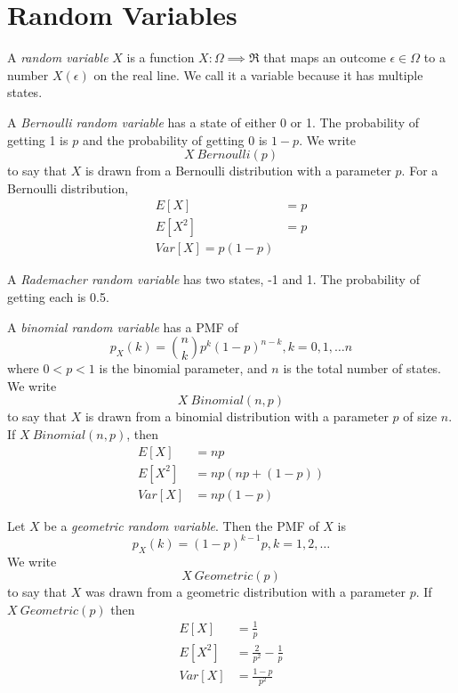 \section{Random Variables}

A \emph{random variable} $X$ is a function $X : \Omega \implies \Re$
that maps an outcome $\epsilon \in \Omega$ to a number $X(\epsilon)$ on the real line.
We call it a variable because it has multiple states.

A \emph{Bernoulli random variable} has a state
of either 0 or 1. The probability of getting 1 is $p$ and
the probability of getting 0 is $1 - p$. We write
\begin{equation}
    X ~ Bernoulli(p)
\end{equation}
to say that $X$ is drawn from a Bernoulli distribution
with a parameter $p$. For a Bernoulli distribution,
\begin{align}
    E[X]   & = p \\
    E[X^2] & = p \\
    Var[X] = p(1 - p)
\end{align}

A \emph{Rademacher random variable} has two states, -1 and 1.
The probability of getting each is 0.5.

A \emph{binomial random variable} has a PMF of
\begin{equation}
    p_X(k) = {n\choose k} p^k (1 - p)^{n - k}, k = 0, 1, \dots n
\end{equation}
where $0 < p < 1$ is the binomial parameter, and $n$ is the total
number of states. We write
\begin{equation}
    X ~ Binomial(n, p)
\end{equation}
to say that $X$ is drawn from a binomial distribution with a
parameter $p$ of size $n$.
If $X ~ Binomial(n, p)$, then
\begin{align}
    E[X]   & = np               \\
    E[X^2] & = np(np + (1 - p)) \\
    Var[X] & = np(1 - p)
\end{align}

Let $X$ be a \emph{geometric random variable}. Then the
PMF of $X$ is
\begin{equation}
    p_X(k) = (1 - p)^{k - 1}p, k=1,2,\dots
\end{equation}
We write
\begin{equation}
    X ~ Geometric(p)
\end{equation}
to say that $X$ was drawn from a geometric
distribution with a parameter $p$.
If $X ~ Geometric(p)$ then
\begin{align}
    E[X]   & = \frac{1}{p}                 \\
    E[X^2] & = \frac{2}{p^2} - \frac{1}{p} \\
    Var[X] & = \frac{1 - p}{p^2}
\end{align}

